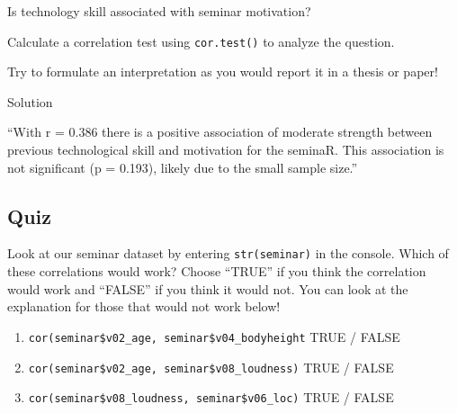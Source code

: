 \documentclass[
]{book}
\newenvironment{Shaded}{\begin{snugshade}}{\end{snugshade}}
\newcommand{\CommentTok}[1]{\textcolor[rgb]{0.56,0.35,0.01}{\textit{#1}}}
\newcommand{\FunctionTok}[1]{\textcolor[rgb]{0.13,0.29,0.53}{\textbf{#1}}}
\newcommand{\NormalTok}[1]{#1}
\newcommand{\SpecialCharTok}[1]{\textcolor[rgb]{0.81,0.36,0.00}{\textbf{#1}}}
\providecommand{\tightlist}{%
  \setlength{\itemsep}{0pt}\setlength{\parskip}{0pt}}
\begin{document}
Is technology skill associated with seminar motivation?

Calculate a correlation test using \texttt{cor.test()} to analyze the question.

Try to formulate an interpretation as you would report it in a thesis or paper!

Solution

\begin{Shaded}
\end{Shaded}

``With r = 0.386 there is a positive association of moderate strength between previous technological skill and motivation for the seminaR. This association is not significant (p = 0.193), likely due to the small sample size.''

\subsection{Quiz}\label{quiz}

Look at our seminar dataset by entering \texttt{str(seminar)} in the console.
Which of these correlations would work?
Choose ``TRUE'' if you think the correlation would work and ``FALSE'' if you think it would not.
You can look at the explanation for those that would not work below!

\begin{enumerate}
\def\labelenumi{\arabic{enumi}.}
\tightlist
\item
  \texttt{cor(seminar\$v02\_age,\ seminar\$v04\_bodyheight} TRUE / FALSE
\item
  \texttt{cor(seminar\$v02\_age,\ seminar\$v08\_loudness)} TRUE / FALSE
\item
  \texttt{cor(seminar\$v08\_loudness,\ seminar\$v06\_loc)} TRUE / FALSE
\end{enumerate}
\end{document}
